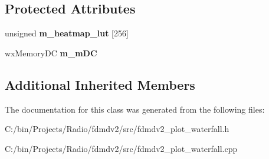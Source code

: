 \subsection*{Protected Attributes}
\begin{DoxyCompactItemize}
\item 
\hypertarget{class_plot_waterfall_aae04482318331ac760954376f23a1e3c}{unsigned {\bfseries m\-\_\-heatmap\-\_\-lut} \mbox{[}256\mbox{]}}\label{class_plot_waterfall_aae04482318331ac760954376f23a1e3c}

\item 
\hypertarget{class_plot_waterfall_a1b80aa40a1194ece27c87ec265ef7d2c}{wx\-Memory\-D\-C {\bfseries m\-\_\-m\-D\-C}}\label{class_plot_waterfall_a1b80aa40a1194ece27c87ec265ef7d2c}

\end{DoxyCompactItemize}
\subsection*{Additional Inherited Members}


The documentation for this class was generated from the following files\-:\begin{DoxyCompactItemize}
\item 
C\-:/bin/\-Projects/\-Radio/fdmdv2/src/fdmdv2\-\_\-plot\-\_\-waterfall.\-h\item 
C\-:/bin/\-Projects/\-Radio/fdmdv2/src/fdmdv2\-\_\-plot\-\_\-waterfall.\-cpp\end{DoxyCompactItemize}
